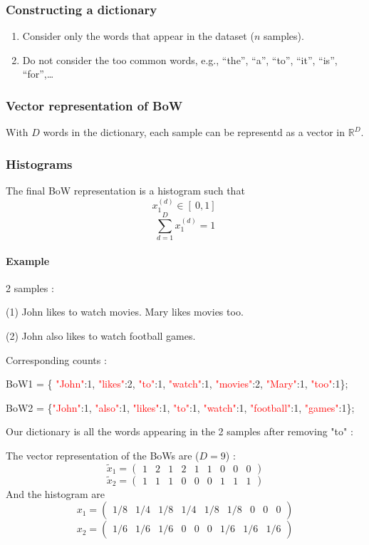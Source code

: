 \subsubsection{Constructing a dictionary}
\begin{enumerate}
  \item Consider only the words that appear in the dataset ($n$ samples).  
  \item Do not consider the too common words, e.g., “the”, “a”, “to”,
“it”, “is”, “for”,…
\end{enumerate}

\subsubsection{Vector representation of BoW}
With $D$ words in the dictionary, each sample can be representd as a vector in $\mathbb{R}^D$.

\subsubsection{Histograms}
The final BoW representation is a histogram such that \[
  x_1^{(d)} \in [\ 0,1]\
\]
\[
  \sum_{d=1}^{D} x_1^{(d)} = 1
\]

\paragraph{Example}
2 samples :

(1) John likes to watch movies. Mary likes movies too. 

(2) John also likes to watch football games. 

Corresponding counts : 

BoW1 = \{ \textcolor{red}{"John"}:1, \textcolor{red}{"likes"}:2, \textcolor{red}{"to"}:1, \textcolor{red}{"watch"}:1, \textcolor{red}{"movies"}:2, \textcolor{red}{"Mary"}:1, \textcolor{red}{"too"}:1\};

BoW2 = \{\textcolor{red}{"John"}:1, \textcolor{red}{"also"}:1, \textcolor{red}{"likes"}:1, \textcolor{red}{"to"}:1, \textcolor{red}{"watch"}:1, \textcolor{red}{"football"}:1, \textcolor{red}{"games"}:1\};
 
Our dictionary is all the words appearing in the 2 samples after removing "to" : 
  
\quad \quad \quad \quad \text{\textcolor{red}{"John", "likes", "watch", "movies", "Mary", "too", "also", "football", "games"}}

The vector representation of the BoWs are ($D = 9$) : \[
  \tilde{x}_1 = \begin{pmatrix}
    1 & 2 & 1 & 2 & 1 & 1 & 0 & 0 & 0   
  \end{pmatrix}
\]
\[
  \tilde{x}_2 = \begin{pmatrix}
    1 & 1 & 1 & 0 & 0 & 0 & 1 & 1 & 1
  \end{pmatrix}
\]
And the histogram are \[
  x_1 = \begin{pmatrix}
    1/8 & 1/4 & 1/8 & 1/4 & 1/8 & 1/8 & 0 & 0 & 0 
  \end{pmatrix}
\]
\[
  x_2 = \begin{pmatrix}
    1/6 & 1/6 & 1/6 & 0 & 0 & 0 & 1/6 & 1/6 & 1/6
  \end{pmatrix}
\]

